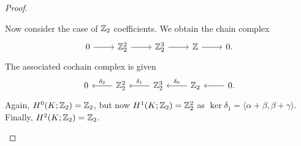 \documentclass{../../mathnotes}
\begin{document}
\begin{proof}
\begin{enumerate}[(a)]
            Now consider the case of $\mathbb{Z}_2$ coefficients. We obtain the chain complex
            \begin{equation*}
                \begin{tikzcd}
                    0\ar{r} & \Z_2^2\ar{r} & \Z_2^3\ar{r} & \Z\ar{r} & 0.
                \end{tikzcd}
            \end{equation*}
            The associated cochain complex is given
            \begin{equation*}
                \begin{tikzcd}
                    0 & \Z_2^2\ar[swap]{l}{\delta_2} & \Z_2^3\ar[swap]{l}{\delta_1} & \Z_2\ar[swap]{l}{\delta_0} & 0\ar{l}.
                \end{tikzcd}
            \end{equation*}
            Again, $H^0(K;\mathbb{Z}_2)=\mathbb{Z}_2$, but now $H^1(K;\mathbb{Z}_2)=\mathbb{Z}_2^2$ as $\ker\delta_1=\langle\alpha+\beta,\beta+\gamma\rangle$.
            Finally, $H^2(K;\mathbb{Z}_2)=\mathbb{Z}_2$.
    \end{enumerate}
\end{proof}
\end{document}
